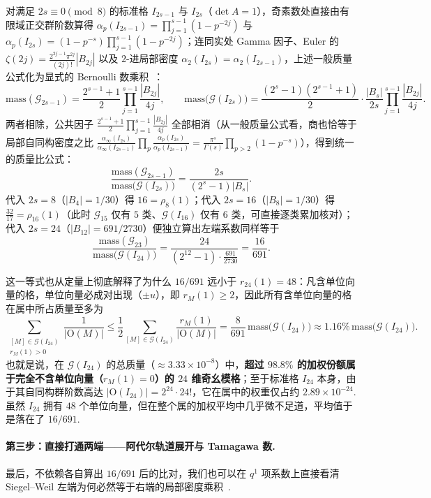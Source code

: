 对满足 $2s\equiv 0\pmod 8$ 的标准格 $I_{2s-1}$ 与 $I_{2s}$（$\det A=1$），奇素数处直接由有限域正交群阶数算得 $\alpha_p(I_{2s-1})=\prod_{j=1}^{s-1}(1-p^{-2j})$ 与 $\alpha_p(I_{2s})=(1-p^{-s})\prod_{j=1}^{s-1}(1-p^{-2j})$；连同实处 Gamma 因子、Euler 的 $\zeta(2j)=\frac{2^{2j-1}\pi^{2j}}{(2j)!}|B_{2j}|$ 以及 $2$-进局部密度 $\alpha_2(I_{2s})=\alpha_2(I_{2s-1})$，上述一般质量公式化为显式的 Bernoulli 数乘积~\cite{ConwaySloane1988,ConwaySloane1999}：
\[
\mathrm{mass}(\mathcal G_{2s-1})
=\frac{2^{s-1}+1}{2}\prod_{j=1}^{s-1}\frac{|B_{2j}|}{4j},
\qquad
\mathrm{mass}\bigl(\mathcal G(I_{2s})\bigr)
=\frac{(2^s-1)(2^{s-1}+1)}{2}\cdot\frac{|B_s|}{2s}\prod_{j=1}^{s-1}\frac{|B_{2j}|}{4j}.
\]
两者相除，公共因子 $\frac{2^{s-1}+1}{2}\prod_{j=1}^{s-1}\frac{|B_{2j}|}{4j}$ 全部相消（从一般质量公式看，商也恰等于局部自同构密度之比 $\frac{\alpha_\infty(I_{2s})}{\alpha_\infty(I_{2s-1})}\prod_p\frac{\alpha_p(I_{2s})}{\alpha_p(I_{2s-1})}=\frac{\pi^s}{\Gamma(s)}\prod_{p>2}(1-p^{-s})$），得到统一的质量比公式：
\[
\frac{\mathrm{mass}(\mathcal G_{2s-1})}{\mathrm{mass}\bigl(\mathcal G(I_{2s})\bigr)}
=\frac{2s}{(2^s-1)|B_s|}.
\]
代入 $2s=8$（$|B_4|=1/30$）得 $16=\rho_8(1)$；代入 $2s=16$（$|B_8|=1/30$）得 $\frac{32}{17}=\rho_{16}(1)$（此时 $\mathcal G_{15}$ 仅有 $5$ 类、$\mathcal G(I_{16})$ 仅有 $6$ 类，可直接逐类累加核对）；代入 $2s=24$（$|B_{12}|=691/2730$）便独立算出左端系数同样等于
\[
\frac{\mathrm{mass}(\mathcal G_{23})}{\mathrm{mass}\bigl(\mathcal G(I_{24})\bigr)}
=\frac{24}{(2^{12}-1)\cdot\frac{691}{2730}}
=\frac{16}{691}.
\]

这一等式也从定量上彻底解释了为什么 $16/691$ 远小于 $r_{24}(1)=48$：凡含单位向量的格，单位向量必成对出现（$\pm u$），即 $r_M(1)\ge 2$，因此所有含单位向量的格在属中所占质量至多为
\[
\sum_{\substack{[M]\in\mathcal G(I_{24})\\ r_M(1)>0}}\frac{1}{|\mathrm O(M)|}
\le \frac{1}{2}\sum_{[M]\in\mathcal G(I_{24})}\frac{r_M(1)}{|\mathrm O(M)|}
=\frac{8}{691}\,\mathrm{mass}\bigl(\mathcal G(I_{24})\bigr)
\approx 1.16\%\,\mathrm{mass}\bigl(\mathcal G(I_{24})\bigr).
\]
也就是说，在 $\mathcal G(I_{24})$ 的总质量（$\approx 3.33\times 10^{-8}$）中，\textbf{超过 $98.8\%$ 的加权份额属于完全不含单位向量（$r_M(1)=0$）的 $24$ 维奇幺模格}；至于标准格 $I_{24}$ 本身，由于其自同构群阶数高达 $|\mathrm O(I_{24})|=2^{24}\cdot 24!$，它在属中的权重仅占约 $2.89\times 10^{-24}$. 虽然 $I_{24}$ 拥有 $48$ 个单位向量，但在整个属的加权平均中几乎微不足道，平均值于是落在了 $16/691$.

\paragraph{第三步：直接打通两端——阿代尔轨道展开与 Tamagawa 数.}
最后，不依赖各自算出 $16/691$ 后的比对，我们也可以在 $q^1$ 项系数上直接看清 Siegel--Weil 左端为何必然等于右端的局部密度乘积~\cite{Weil1965,Weil1982}.

